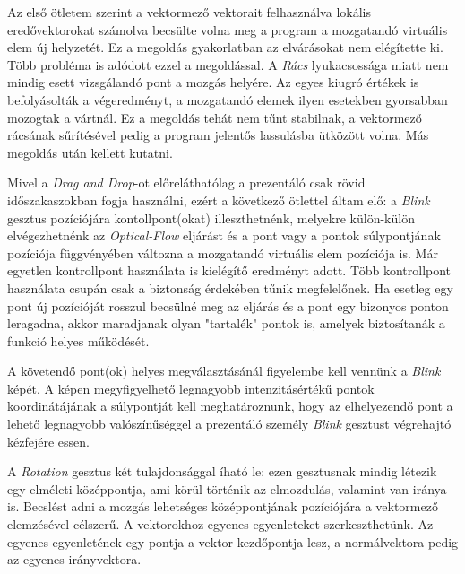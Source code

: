 Az első ötletem szerint a vektormező vektorait felhasználva lokális eredővektorokat számolva becsülte volna meg a program a mozgatandó virtuális elem új helyzetét. Ez a megoldás gyakorlatban az elvárásokat nem elégítette ki. Több probléma is adódott ezzel a megoldással. A \textit{Rács} lyukacsossága miatt nem mindig esett vizsgálandó pont a mozgás helyére. Az egyes kiugró értékek is befolyásolták a végeredményt, a mozgatandó elemek ilyen esetekben gyorsabban mozogtak a vártnál. Ez a megoldás tehát nem tűnt stabilnak, a vektormező rácsának sűrítésével pedig a program jelentős lassulásba ütközött volna. Más megoldás után kellett kutatni.

Mivel a \textit{Drag and Drop}-ot előreláthatólag a prezentáló csak rövid időszakaszokban fogja használni, ezért a következő ötlettel áltam elő: a \textit{Blink} gesztus pozíciójára kontollpont(okat) illeszthetnénk, melyekre külön-külön elvégezhetnénk az \textit{Optical-Flow} eljárást és a pont vagy a pontok súlypontjának pozíciója függvényében változna a mozgatandó virtuális elem pozíciója is. Már egyetlen kontrollpont használata is kielégítő eredményt adott. Több kontrollpont használata csupán csak a biztonság érdekében tűnik megfelelőnek. Ha esetleg egy pont új pozícióját rosszul becsülné meg az eljárás és a pont egy bizonyos ponton leragadna, akkor maradjanak olyan "tartalék" pontok is, amelyek biztosítanák a funkció helyes működését.

A követendő pont(ok) helyes megválasztásánál figyelembe kell vennünk a \textit{Blink} képét. A képen megyfigyelhető legnagyobb intenzitásértékű pontok koordinátájának a súlypontját kell meghatároznunk, hogy az elhelyezendő pont a lehető legnagyobb valószínűséggel a prezentáló személy \textit{Blink} gesztust végrehajtó kézfejére essen.


A \textit{Rotation} gesztus két tulajdonsággal íható le: ezen gesztusnak mindig létezik egy elméleti középpontja, ami körül történik az elmozdulás, valamint van iránya is.
Becslést adni a mozgás lehetséges középpontjának pozíciójára a vektormező elemzésével célszerű.
A vektorokhoz egyenes egyenleteket szerkeszthetünk. Az egyenes egyenletének egy pontja a vektor kezdőpontja lesz, a normálvektora pedig az egyenes irányvektora.

